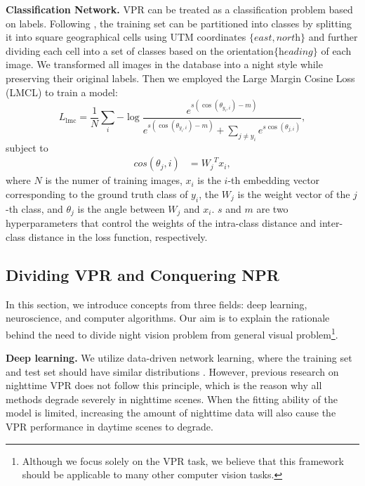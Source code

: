 \documentclass[10pt,twocolumn,letterpaper]{article}
\begin{document}
\noindent \textbf{Classification Network.} VPR can be treated as a classification problem based on labels. Following \cite{cosplace}, the training set can be partitioned into classes by splitting it into square geographical cells using UTM coordinates $\{\textit{east}, \textit{north}\}$ and further dividing each cell into a set of classes based on the orientation$\{\textit{heading}\}$ of each image. We transformed all images in the database into a night style while preserving their original labels. Then we employed the Large Margin Cosine Loss (LMCL) \cite{cosface} to train a model:
\begin{equation}
 L_{\mathrm{lmc}} = \frac{1}{N}\sum_{i}{-\log{\frac{e^{s (\cos(\theta_{{y_i}, i}) - m)}}{e^{s (\cos(\theta_{{y_i}, i}) - m)} + \sum_{j \neq y_i}{e^{s \cos(\theta_{j, i})}}}}},
\end{equation}
subject to
\begin{equation}
\begin{split}
  cos(\theta_j,i) &= {W_j}^Tx_i,
\end{split}
\end{equation}
where $N$ is the numer of training images, $x_i$ is the $i$-th embedding vector corresponding to the ground truth class of $y_i$, the $W_j$ is the weight vector of the $j$-th class, and $\theta_j$ is the angle between $W_j$ and $x_i$. $s$ and $m$ are two hyperparameters that control the weights of the intra-class distance and inter-class distance in the loss function, respectively.


\subsection{Dividing VPR and Conquering NPR}

In this section, we introduce concepts from three fields: deep learning, neuroscience, and computer algorithms. Our aim is to explain the rationale behind the need to divide night vision problem from general visual problem\footnote{Although we focus solely on the VPR task, we believe that this framework should be applicable to many other computer vision tasks.}. 

\noindent \textbf{Deep learning.} We utilize data-driven network learning, where the training set and test set should have similar distributions \cite{deeplearning}. However, previous research on nighttime VPR does not follow this principle, which is the reason why all methods degrade severely in nighttime scenes. When the fitting ability of the model is limited, increasing the amount of nighttime data will also cause the VPR performance in daytime scenes to degrade.
\end{document}
